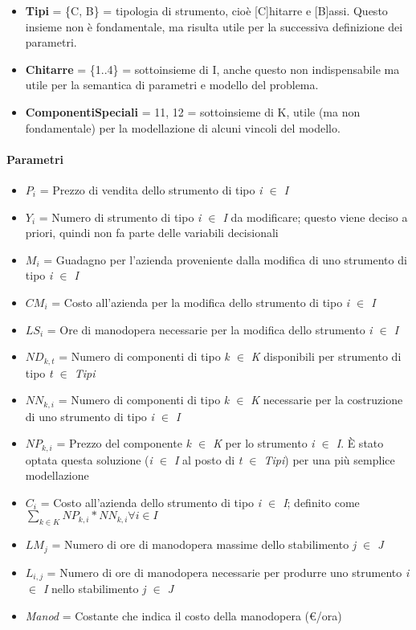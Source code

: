 \begin{itemize}
\begin{enumerate}
\end{enumerate}
\item[] \textbf{Tipi} = \{C, B\} = tipologia di strumento, cioè [C]hitarre e [B]assi. Questo insieme non è fondamentale, ma risulta utile per la successiva definizione dei parametri.
\item[] \textbf{Chitarre} = \{1..4\} = sottoinsieme di I, anche questo non indispensabile ma utile per la semantica di parametri e modello del problema.
\item[] \textbf{ComponentiSpeciali} = {11, 12} = sottoinsieme di K, utile (ma non fondamentale) per la modellazione di alcuni vincoli del modello.
\end{itemize}

\paragraph*{Parametri}
\begin{itemize}
\item[] $P_i$ = Prezzo di vendita dello strumento di tipo \textit{i $\in$ I}
\item[] $Y_i$ = Numero di strumento di tipo \textit{i $\in$ I} da modificare; questo viene deciso a priori, quindi non fa parte delle variabili decisionali
\item[] $M_i$ = Guadagno per l'azienda proveniente dalla modifica di uno strumento di tipo \textit{i $\in$ I}
\item[] $CM_i$ = Costo all'azienda per la modifica dello strumento di tipo \textit{i $\in$ I}
\item[] $LS_i$ = Ore di manodopera necessarie per la modifica dello strumento \textit{i $\in$ I}
\item[] $ND_{k,t}$ = Numero di componenti di tipo \textit{k $\in$ K} disponibili per strumento di tipo \textit{t $\in$ Tipi}
\item[] $NN_{k,i}$ = Numero di componenti di tipo \textit{k $\in$ K} necessarie per la costruzione di uno strumento di tipo \textit{i $\in$ I}
\item[] $NP_{k,i}$ = Prezzo del componente \textit{k $\in$ K} per lo strumento \textit{i $\in$ I}. È stato optata questa soluzione (\textit{i $\in$ I} al posto di \textit{t $\in$ Tipi}) per una più semplice modellazione
\item[] $C_i$ = Costo all'azienda dello strumento di tipo \textit{i $\in$ I}; definito come $\sum_{k\in K} NP_{k,i}*NN_{k,i} \forall i\in I$
\item[] $LM_j$ = Numero di ore di manodopera massime dello stabilimento \textit{j $\in$ J}
\item[] $L_{i,j}$ = Numero di ore di manodopera necessarie per produrre uno strumento \textit{i $\in$ I} nello stabilimento \textit{j $\in$ J}
\item[] \textit{Manod} = Costante che indica il costo della manodopera (\euro /ora)
\end{itemize}

